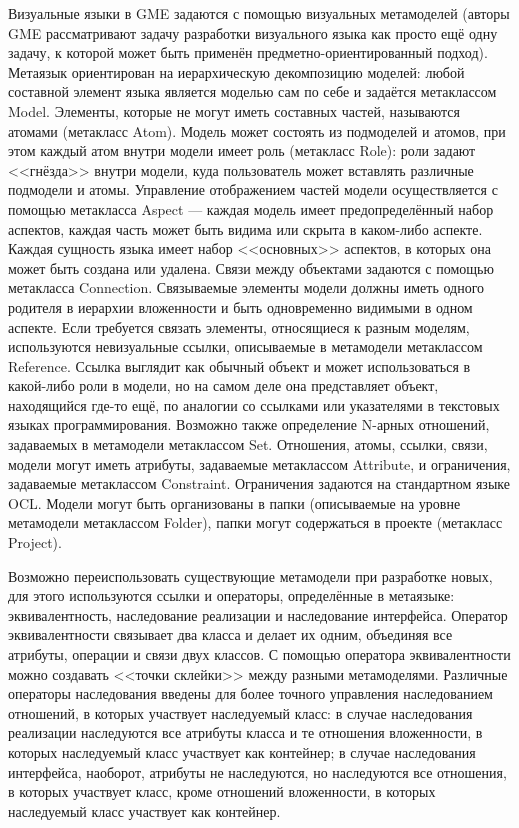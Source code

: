 Визуальные языки в GME задаются с помощью визуальных метамоделей (авторы GME рассматривают 
задачу разработки визуального языка как просто ещё одну задачу, к которой может быть 
применён предметно-ориентированный подход). Метаязык ориентирован на иерархическую 
декомпозицию моделей: любой составной элемент языка является моделью сам по себе и 
задаётся метаклассом Model. Элементы, которые не могут иметь составных частей, называются 
атомами (метакласс Atom). Модель может состоять из подмоделей и атомов, при этом каждый 
атом внутри модели имеет роль (метакласс Role): роли задают <<гнёзда>> внутри модели, 
куда пользователь может вставлять различные подмодели и атомы. Управление отображением 
частей модели осуществляется с помощью метакласса Aspect --- каждая модель имеет предопределённый 
набор аспектов, каждая часть может быть видима или скрыта в каком-либо аспекте. Каждая 
сущность языка имеет набор <<основных>> аспектов, в которых она может быть создана 
или удалена. Связи между объектами задаются с помощью метакласса Connection. Связываемые 
элементы модели должны иметь одного родителя в иерархии вложенности и быть одновременно 
видимыми в одном аспекте. Если требуется связать элементы, относящиеся к разным моделям, 
используются невизуальные ссылки, описываемые в метамодели метаклассом Reference. Ссылка 
выглядит как обычный объект и может использоваться в какой-либо роли в модели, но на 
самом деле она представляет объект, находящийся где-то ещё, по аналогии со ссылками 
или указателями в текстовых языках программирования. Возможно также определение N-арных 
отношений, задаваемых в метамодели метаклассом Set. Отношения, атомы, ссылки, связи, 
модели могут иметь атрибуты, задаваемые метаклассом Attribute, и ограничения, задаваемые 
метаклассом Constraint. Ограничения задаются на стандартном языке OCL. Модели могут 
быть организованы в папки (описываемые на уровне метамодели метаклассом Folder), папки 
могут содержаться в проекте (метакласс Project).

Возможно переиспользовать существующие метамодели при разработке новых, для этого 
используются ссылки и операторы, определённые в метаязыке: эквивалентность, наследование 
реализации и наследование интерфейса. Оператор эквивалентности связывает два класса 
и делает их одним, объединяя все атрибуты, операции и связи двух классов. С помощью 
оператора эквивалентности можно создавать <<точки склейки>> между разными метамоделями. 
Различные операторы наследования введены для более точного управления наследованием 
отношений, в которых участвует наследуемый класс: в случае наследования реализации 
наследуются все атрибуты класса и те отношения вложенности, в которых наследуемый 
класс участвует как контейнер; в случае наследования интерфейса, наоборот, атрибуты 
не наследуются, но наследуются все отношения, в которых участвует класс, кроме отношений 
вложенности, в которых наследуемый класс участвует как контейнер.

